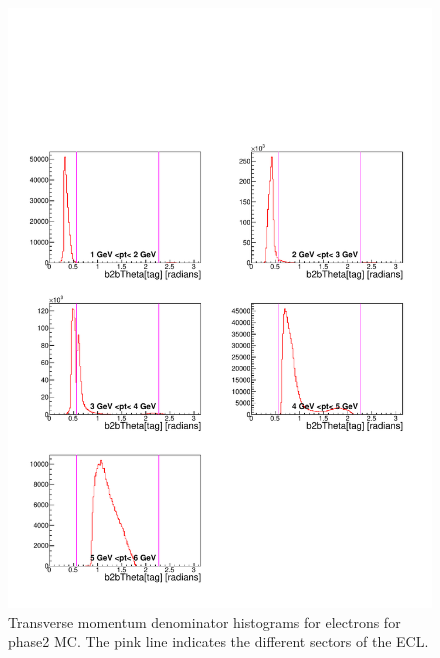 \documentclass[a4paper,11pt,twosided,final,german,openbib,pdftex,listof=totoc,bibliography=totoc]{scrbook}
\begin{document}
\begin{appendix}
\begin{figure}[!htbp]
	\centering
	\includegraphics[width=\textwidth]{Plots/master/xPtMThetaemD_MC}
	\caption[Transverse Momentum $\theta$ Electron Denominator Histogram Phase2 MC]{Transverse momentum denominator histograms for electrons for phase2 MC. The pink line indicates the different sectors of the ECL.}
	\label{plt:PtMThetaemD_MC}
\end{figure}



\end{appendix}
\end{document}
